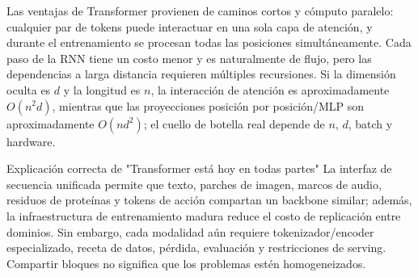 Las ventajas de Transformer provienen de caminos cortos y cómputo paralelo: cualquier par de tokens puede interactuar en una sola capa de atención, y durante el entrenamiento se procesan todas las posiciones simultáneamente. Cada paso de la RNN tiene un costo menor y es naturalmente de flujo, pero las dependencias a larga distancia requieren múltiples recursiones. Si la dimensión oculta es $d$ y la longitud es $n$, la interacción de atención es aproximadamente $O(n^2d)$, mientras que las proyecciones posición por posición/MLP son aproximadamente $O(nd^2)$; el cuello de botella real depende de $n$, $d$, batch y hardware.





\begin{importantbox}{Explicación correcta de "Transformer está hoy en todas partes"}
La interfaz de secuencia unificada permite que texto, parches de imagen, marcos de audio, residuos de proteínas y tokens de acción compartan un backbone similar; además, la infraestructura de entrenamiento madura reduce el costo de replicación entre dominios. Sin embargo, cada modalidad aún requiere tokenizador/encoder especializado, receta de datos, pérdida, evaluación y restricciones de serving. Compartir bloques no significa que los problemas estén homogeneizados.
\end{importantbox}


